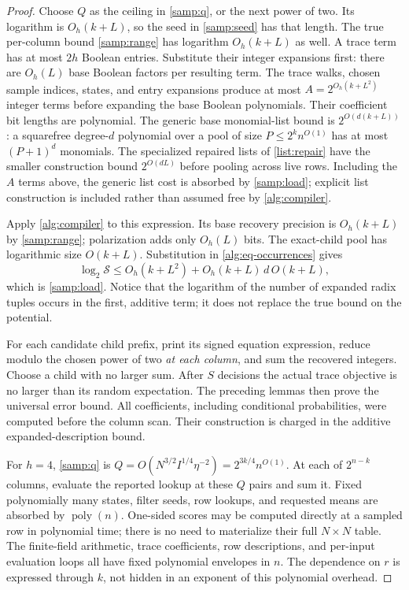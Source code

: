 \documentclass[11pt,letterpaper]{article}
\theoremstyle{definition}
\theoremstyle{remark}
\newcommand{\poly}{\operatorname{poly}}
\begin{document}
\begin{proof}
Choose $Q$ as the ceiling in \cref{samp:q}, or the next power of two.
Its logarithm is $O_h(k+L)$, so the seed in \cref{samp:seed} has that
length. The true per-column bound \cref{samp:range} has logarithm
$O_h(k+L)$ as well. A trace term has at most $2h$ Boolean entries.
Substitute their integer expansions first: there are $O_h(L)$ base
Boolean factors per resulting term. The trace walks, chosen sample
indices, states, and entry expansions produce at most
$A=2^{O_h(k+L^2)}$ integer terms before expanding the base Boolean
polynomials. Their coefficient bit lengths are polynomial.
The generic base monomial-list bound is $2^{O(d(k+L))}$:
a squarefree degree-$d$ polynomial over a pool of size
$P\le2^k n^{O(1)}$ has at most $(P+1)^d$ monomials.
The specialized repaired lists of \cref{list:repair} have the smaller
construction bound $2^{O(dL)}$ before pooling across live rows.
Including the $A$ terms above, the generic list cost is absorbed by
\cref{samp:load}; explicit list construction is included rather than
assumed free by \cref{alg:compiler}.

Apply \cref{alg:compiler} to this expression. Its base recovery
precision is $O_h(k+L)$ by \cref{samp:range}; polarization adds only
$O_h(L)$ bits. The exact-child pool has logarithmic size $O(k+L)$.
Substitution in \cref{alg:eq-occurrences} gives
\[
\log_2\mathcal S
\le O_h(k+L^2)+O_h(k+L)\,d\,O(k+L),
\]
which is \cref{samp:load}. Notice that the logarithm of the number
of expanded radix tuples occurs in the first, additive term; it does
not replace the true bound on the potential.

For each candidate child prefix, print its signed equation expression,
reduce modulo the chosen power of two \emph{at each column}, and sum
the recovered integers. Choose a child with no larger sum. After $S$
decisions the actual trace objective is no larger than its random
expectation. The preceding lemmas then prove the universal error bound.
All coefficients, including conditional probabilities, were computed
before the column scan. Their construction is charged in the additive
expanded-description bound.

For $h=4$, \cref{samp:q} is
$Q=O(N^{3/2}I^{1/4}\eta^{-2})=2^{3k/4}n^{O(1)}$.
At each of $2^{n-k}$ columns, evaluate the reported lookup at these
$Q$ pairs and sum it. Fixed polynomially many states, filter seeds,
row lookups, and requested means are absorbed by $\poly(n)$.
One-sided scores may be computed directly at a sampled row in polynomial
time; there is no need to materialize their full $N\times N$ table.
The finite-field arithmetic, trace coefficients, row descriptions, and
per-input evaluation loops all have fixed polynomial envelopes in $n$.
The dependence on $r$ is expressed through $k$, not hidden in an exponent
of this polynomial overhead.
\end{proof}
\end{document}
